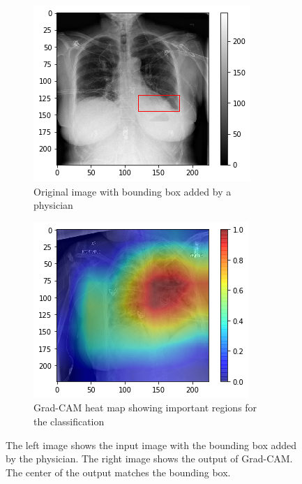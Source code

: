 \begin{figure}[H]
    \centering
    \begin{subfigure}[t]{.45\textwidth}
        \centering
        \includegraphics[width=\linewidth]{chapters/03_classification/images/rise1_bbox.png}
        \caption{Original image with bounding box added by a physician}
    \end{subfigure}\hspace{1cm}%
    \begin{subfigure}[t]{.45\textwidth}
        \centering
        \includegraphics[width=\linewidth]{chapters/03_classification/images/grad-cam_8.png}
        \caption{Grad-CAM heat map showing important regions for the classification}
    \end{subfigure}
    \caption{The left image shows the input image with the bounding box added by the physician. The right image shows the output of Grad-CAM. The center of the output matches the bounding box.}
\label{grad_cam_example_3}
\end{figure}

